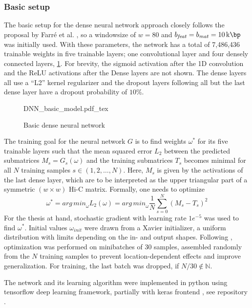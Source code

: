 \subsubsection{Basic setup} \label{sec:methods:basicSetup}
The basic setup for the dense neural network approach closely follows the proposal by Farr\'e et al. \cite{Farre2018a},
so a windowsize of $w=80$ and $b_\mathit{feat}=b_\mathit{mat} = \SI{10}{\kilo\bp}$ was initially used.
With these parameters, the network has a total of 7,486,436 trainable weights in five trainable layers; 
one convolutional layer and four densely connected layers, \cref{fig:methods:basic_dnn}.
For brevity, the sigmoid activation after the 1D convolution and the ReLU activations after the Dense layers are not shown.
The dense layers all use a ``L2'' kernel regularizer and the dropout layers following all but the last dense layer have a dropout probability of $10\%$.
\begin{figure}[htb]
    \small
    \centering
    {DNN_basic_model.pdf_tex}
    \caption{Basic dense neural network}
    \label{fig:methods:basic_dnn}
\end{figure}

The training goal for the neural network $G$ is to find weights $\omega^*$ for its five trainable layers 
such that the mean squared error $L_2$ between the predicted submatrices $M_s = G_s(\omega)$ 
and the training submatrices $T_s$ becomes minimal for all $N$ training samples $s \in (1,2,\dots, N)$. 
Here, $M_s$ is given by the activations of the last dense layer, which are to be interpreted as the upper triangular 
part of a symmetric $(w\times w)$ Hi-C matrix.
Formally, one needs to optimize
\begin{equation}
 \omega^* = \mathit{arg\,min}_\omega L_2(\omega) = \mathit{arg\,min}_\omega \frac{1}{N} \sum_{s=0}^N (M_s - T_s)^2 \label{eq:methods:nn-mse}
\end{equation} 
For the thesis at hand, stochastic gradient with learning rate $1e^{-5}$  was used to find $\omega^*$.
Initial values $\omega_\mathit{init}$ were drawn from a Xavier initializer, a uniform distribution with limits depending on the in- and output shapes.
Following \cite{Farre2018a}, optimization was performed on minibatches of 30 samples, assembled randomly from the $N$ training samples
to prevent location-dependent effects and improve generalization.
For training, the last batch was dropped, if $N/30 \not \in \mathbb{N}$. 

The network and its learning algorithm were implemented in python using tensorflow deep learning framework, partially with keras frontend \cite{Abadi2015,Chollet2015}, 
see repository \xxx.

